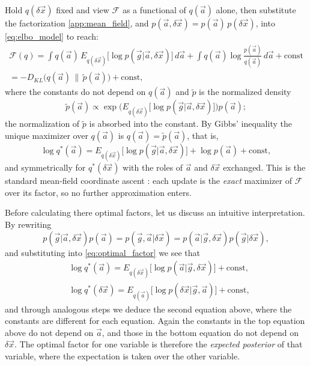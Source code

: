 \documentclass{article}
\begin{document}
Hold $q(\delta\vec x)$ fixed and view $\mathcal F$ as a functional of $q(\vec a)$ alone, then substitute the factorization \eqref{app:mean_field}, and $p(\vec a, \delta \vec x) = p(\vec a)\, p(\delta \vec x)$, into \eqref{eq:elbo_model} to reach:
\begin{multline}
    \mathcal F(q) = \int q(\vec a)\, E_{q(\delta\vec x)}\big[\log p(\vec g| \vec a, \delta\vec x)\big]\, d\vec a + \int q(\vec a)\log \frac{p(\vec a)}{q(\vec a)}\, d\vec a + \text{const}
    \\
    = -D_{KL}\big(q(\vec a)\,\|\,\tilde p(\vec a)\big) + \text{const},
\end{multline}
where the constants do not depend on $q(\vec a)$ and $\tilde p$ is the normalized density
\begin{equation}
    \tilde p(\vec a) \propto \exp\Big(E_{q(\delta\vec x)}\big[\log p(\vec g | \vec a, \delta\vec x)\big]\Big) p(\vec a);
\end{equation}
the normalization of $\tilde p$ is absorbed into the constant. By Gibbs' inequality the unique maximizer over $q(\vec a)$ is $q(\vec a) = \tilde p(\vec a)$, that is,
\begin{equation}
    \log q^*(\vec a) = E_{q(\delta\vec x)}\big[\log p(\vec g|\vec a, \delta\vec x)\big] + \log p(\vec a) + \text{const}, \label{eq:optimal_factor}
\end{equation}
and symmetrically for $q^*(\delta\vec x)$ with the roles of $\vec a$ and $\delta\vec x$ exchanged. This is the standard mean-field coordinate ascent \cite{bishop2006pattern}: each update is the \emph{exact} maximizer of $\mathcal F$ over its factor, so no further approximation enters.

Before calculating there optimal factors, let us discuss an intuitive interpretation. By rewriting 
\[
p(\vec g|\vec a, \delta\vec x) p (\vec a) = p(\vec g, \vec a| \delta\vec x) = p(\vec a|\vec g, \delta\vec x) p(\vec g|\delta\vec x),
\]
and substituting into \eqref{eq:optimal_factor} we see that 
\begin{align} \label{eq:a-factor-intuitive}
    & \log q^*(\vec a) = E_{q(\delta\vec x)}\big[\log p(\vec a|\vec g, \delta\vec x)\big] + \text{const}, 
    \\
    & \log q^*(\delta\vec x) = E_{q(\vec a)}\big[\log p(\delta\vec x|\vec g, \vec a)\big] + \text{const}, 
\end{align}
and through analogous steps we deduce the second equation above, where the constants are different for each equation. Again the constants in the top equation above do not depend on $\vec a$, and those in the bottom equation do not depend on $\delta\vec x$. The optimal factor for one variable is therefore the \emph{expected posterior} of that variable, where the expectation is taken over the other variable. 
\end{document}
